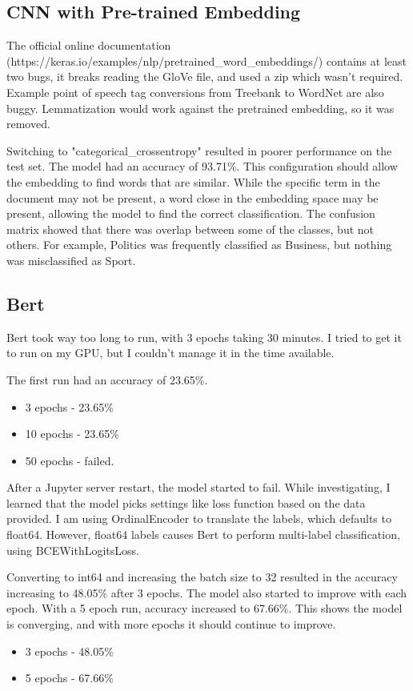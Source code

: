 \documentclass[11pt]{article}
\begin{document}
\subsection{CNN with Pre-trained Embedding}

The official online documentation (https://keras.io/examples/nlp/pretrained\_word\_embeddings/) contains at least two bugs, it breaks reading the GloVe file, and used a zip which wasn't required. Example point of speech tag conversions from Treebank to WordNet are also buggy. Lemmatization would work against the pretrained embedding, so it was removed.

Switching to "categorical\_crossentropy" resulted in poorer performance on the test set. The model had an accuracy of 93.71\%. This configuration should allow the embedding to find words that are similar. While the specific term in the document may not be present, a word close in the embedding space may be present, allowing the model to find the correct classification. The confusion matrix showed that there was overlap between some of the classes, but not others. For example, Politics was frequently classified as Business, but nothing was misclassified as Sport.

\subsection{Bert}

Bert took way too long to run, with 3 epochs taking 30 minutes. I tried to get it to run on my GPU, but I couldn't manage it in the time available.

The first run had an accuracy of 23.65\%.

\begin{itemize}
\item 3 epochs - 23.65\%
\item 10 epochs - 23.65\%
\item 50 epochs - failed.
\end{itemize}

After a Jupyter server restart, the model started to fail. While investigating, I learned that the model picks settings like loss function based on the data provided. I am using OrdinalEncoder to translate the labels, which defaults to float64. However, float64 labels causes Bert to perform multi-label classification, using BCEWithLogitsLoss.

Converting to int64 and increasing the batch size to 32 resulted in the accuracy increasing to 48.05\% after 3 epochs. The model also started to improve with each epoch. With a 5 epoch run, accuracy increased to 67.66\%. This shows the model is converging, and with more epochs it should continue to improve.

\begin{itemize}
\item 3 epochs - 48.05\%
\item 5 epochs - 67.66\%
\end{itemize}
\end{document}

